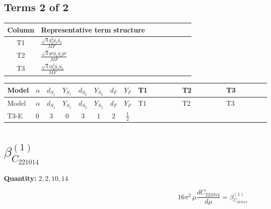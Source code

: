 \documentclass[8pt]{article}
\begin{document}
\begin{landscape}
\subsection*{Terms 2 of 2}
\begin{center}
\begin{tabular}{@{}c >{\raggedright\arraybackslash}p{0.82\linewidth}@{}}
\toprule
Column & Representative term structure \\
\midrule
T1 & \(\displaystyle \frac{\sqrt{3} g_{2}^{2} \overline{y_{1}} \overline{y_{2}}}{MF}\) \\
\midrule
T2 & \(\displaystyle \frac{\sqrt{3} ye \overline{y_{1}} \overline{y_{2}} \overline{ye}}{MF}\) \\
\midrule
T3 & \(\displaystyle \frac{\sqrt{3} i g_{2}^{2} \overline{y_{1}} \overline{y_{2}}}{MF}\) \\
\midrule
\bottomrule
\end{tabular}
\end{center}
\smallskip
\tiny
\begin{longtable}{@{}llcccccc >{\raggedright\arraybackslash}p{0.21\linewidth} >{\raggedright\arraybackslash}p{0.21\linewidth} >{\raggedright\arraybackslash}p{0.21\linewidth}@{}}
\toprule
Model & $\alpha$ & $d_{S_1}$ & $Y_{S_1}$ & $d_{S_2}$ & $Y_{S_2}$ & $d_F$ & $Y_F$ & T1 & T2 & T3 \\
\midrule
\endfirsthead
\toprule
Model & $\alpha$ & $d_{S_1}$ & $Y_{S_1}$ & $d_{S_2}$ & $Y_{S_2}$ & $d_F$ & $Y_F$ & T1 & T2 & T3 \\
\midrule
\endhead
T3-E & $0$ & $3$ & $0$ & $3$ & $1$ & $2$ & $\frac{1}{2}$ & \scriptsize\adjustbox{max width=\linewidth}{$\begin{gathered} \frac{11 \sqrt{3} g_{2}^{2} \overline{y_{1}} \overline{y_{2}}}{8 MF}\end{gathered}$} & \scriptsize\adjustbox{max width=\linewidth}{$\begin{gathered} - \frac{\sqrt{3} ye \overline{y_{1}} \overline{y_{2}} \overline{ye}}{12 MF}\end{gathered}$} & \scriptsize\adjustbox{max width=\linewidth}{$\begin{gathered} \frac{\sqrt{3} i g_{2}^{2} \overline{y_{1}} \overline{y_{2}}}{6 MF}\end{gathered}$} \\
\midrule
\bottomrule
\end{longtable}
\clearpage
\section*{$\beta_{C_{221014}}^{(1)}$}
\noindent\textbf{Quantity: }$\mathrm{2,2,10,14}$\par\smallskip
\[16\pi^2\,\mu\frac{d C_{221014}}{d\mu}=\beta_{C_{221014}}^{(1)}\]

\end{landscape}
\end{document}

